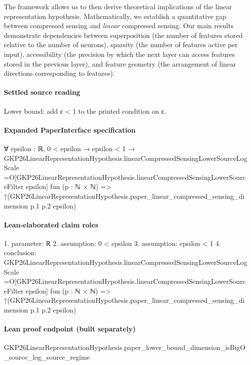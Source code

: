\documentclass[10pt]{article}
\begin{document}
\begin{ReviewVerbatim}
The framework allows us to then derive theoretical implications of the linear representation hypothesis. Mathematically, we establish a quantitative gap between compressed sensing and \textit{linear} compressed sensing. Our main results demonstrate dependencies between superposition (the number of features stored relative to the number of neurons), sparsity (the number of features active per input), accessibility (the precision by which the next layer can access features stored in the previous layer), and feature geometry (the arrangement of linear directions corresponding to features).
\end{ReviewVerbatim}

\paragraph{Settled source reading}
Lower bound: add ε < 1 to the printed condition on ε.

\paragraph{Expanded PaperInterface specification}
\begin{ReviewVerbatim}
∀ {epsilon : ℝ},
  0 < epsilon →
    epsilon < 1 →
      GKP26LinearRepresentationHypothesis.linearCompressedSensingLowerSourceLogScale =O[GKP26LinearRepresentationHypothesis.linearCompressedSensingLowerSourceFilter
          epsilon]
        fun (p : ℕ × ℕ) =>
        ↑(GKP26LinearRepresentationHypothesis.paper_linear_compressed_sensing_dimension p.1 p.2 epsilon)
\end{ReviewVerbatim}

\paragraph{Lean-elaborated claim roles}\begin{ReviewVerbatim}
1. parameter: ℝ
2. assumption: 0 < epsilon
3. assumption: epsilon < 1
4. conclusion: GKP26LinearRepresentationHypothesis.linearCompressedSensingLowerSourceLogScale =O[GKP26LinearRepresentationHypothesis.linearCompressedSensingLowerSourceFilter
    epsilon]
  fun (p : ℕ × ℕ) => ↑(GKP26LinearRepresentationHypothesis.paper_linear_compressed_sensing_dimension p.1 p.2 epsilon)
\end{ReviewVerbatim}

\paragraph{Lean proof endpoint (built separately)}\begin{ReviewVerbatim}
GKP26LinearRepresentationHypothesis.paper_lower_bound_dimension_isBigO_source_log_source_regime
\end{ReviewVerbatim}
\end{document}
